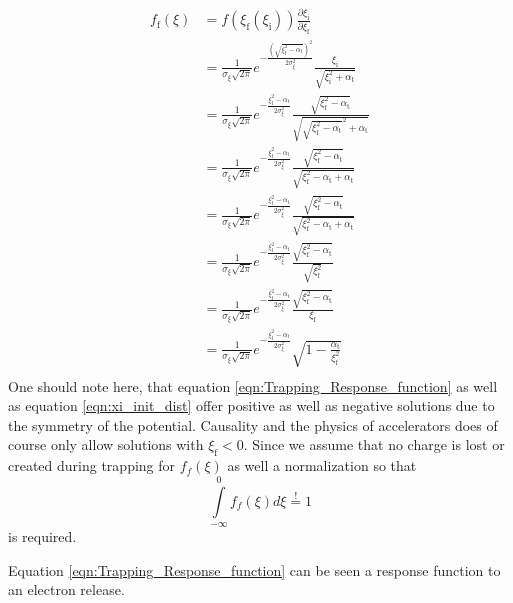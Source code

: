 \begin{align}
f_\mathrm{f}(\xi)&=f(\xi_\mathrm{f}(\xi_\mathrm{i}))\frac{\partial \xi_\mathrm{i}}{\partial \xi_\mathrm{f}}\\
&=\frac{1}{\sigma_\xi \sqrt{2\pi}}e^{-\frac{(\sqrt{\xi_\mathrm{f}^2-\alpha_\mathrm{t}})^2}{2\sigma_\xi^2}} \frac{\xi_\mathrm{i}}{\sqrt{\xi_\mathrm{i}^2+\alpha_\mathrm{t}}}\\
&=\frac{1}{\sigma_\xi \sqrt{2\pi}}e^{-\frac{\xi_\mathrm{f}^2-\alpha_\mathrm{t}}{2\sigma_\xi^2}} \frac{\sqrt{\xi_\mathrm{f}^2-\alpha_\mathrm{t}}}{\sqrt{\sqrt{\xi_\mathrm{f}^2-\alpha_\mathrm{t}}^2+\alpha_\mathrm{t}}}\\
&=\frac{1}{\sigma_\xi \sqrt{2\pi}}e^{-\frac{\xi_\mathrm{f}^2-\alpha_\mathrm{t}}{2\sigma_\xi^2}} \frac{\sqrt{\xi_\mathrm{f}^2-\alpha_\mathrm{t}}}{\sqrt{\xi_\mathrm{f}^2-\alpha_\mathrm{t}+\alpha_\mathrm{t}}}\\
&=\frac{1}{\sigma_\xi \sqrt{2\pi}}e^{-\frac{\xi_\mathrm{f}^2-\alpha_\mathrm{t}}{2\sigma_\xi^2}} \frac{\sqrt{\xi_\mathrm{f}^2-\alpha_\mathrm{t}}}{\sqrt{\xi_\mathrm{f}^2-\alpha_\mathrm{t}+\alpha_\mathrm{t}}}\\
&=\frac{1}{\sigma_\xi \sqrt{2\pi}}e^{-\frac{\xi_\mathrm{f}^2-\alpha_\mathrm{t}}{2\sigma_\xi^2}} \frac{\sqrt{\xi_\mathrm{f}^2-\alpha_\mathrm{t}}}{\sqrt{\xi_\mathrm{f}^2}}\\
&=\frac{1}{\sigma_\xi \sqrt{2\pi}}e^{-\frac{\xi_\mathrm{f}^2-\alpha_\mathrm{t}}{2\sigma_\xi^2}} \frac{\sqrt{\xi_\mathrm{f}^2-\alpha_\mathrm{t}}}{\xi_\mathrm{f}}\\
\label{eqn:Trapping_Response_function}
&=\frac{1}{\sigma_\xi \sqrt{2\pi}}e^{-\frac{\xi_\mathrm{f}^2-\alpha_\mathrm{t}}{2\sigma_\xi^2}} 
\sqrt{1-\frac{\alpha_\mathrm{t}}{\xi_\mathrm{f}^2}}\\
\end{align} 
One should note here, that equation \ref{eqn:Trapping_Response_function} as well as equation \ref{eqn:xi_init_dist} offer positive as well as negative solutions due to the symmetry of the potential. Causality and the physics of accelerators does of course only allow solutions with $\xi_\mathrm{f}<0$. Since we assume that no charge is lost or created during trapping for $f_f(\xi)$ as well a normalization so that
\begin{equation}
\int \limits_{-\infty}^{0} f_f(\xi)d\xi\stackrel{!}{=}1
\end{equation}
is required.

Equation \ref{eqn:Trapping_Response_function} can be seen a response function to an electron release. 



